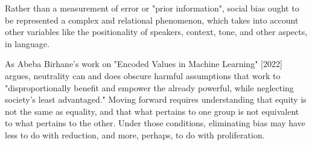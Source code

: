 \documentclass[11pt]{article}
\begin{document}
Rather than a measurement of error or "prior information", social bias
ought to be represented a complex and relational phenomenon, which
takes into account other variables like the positionality of speakers,
context, tone, and other aspects, in language.

As Abeba Birhane's work on "Encoded Values in Machine Learning" [2022]
argues, neutrality can and does obscure harmful assumptions that work
to "disproportionally benefit and empower the already powerful, while
neglecting society’s least advantaged." Moving forward requires
understanding that equity is not the same as equality, and that what
pertains to one group is not equivalent to what pertains to the other.
Under those conditions, eliminating bias may have less to do with
reduction, and more, perhaps, to do with proliferation.
\end{document}
